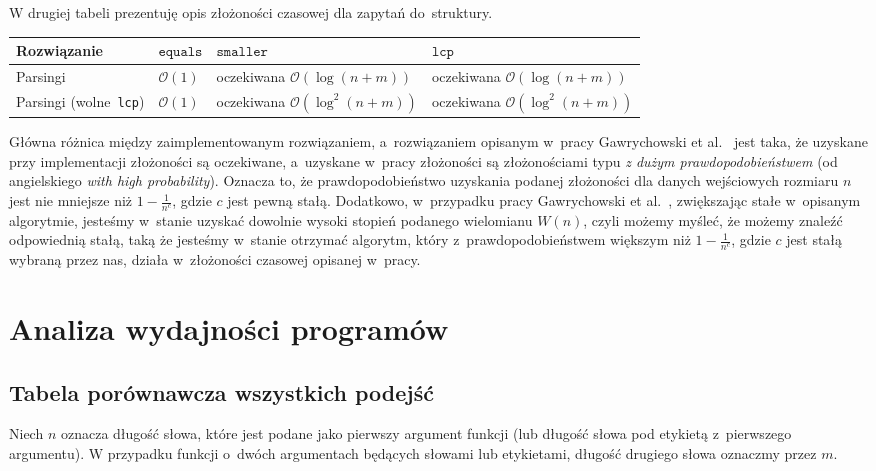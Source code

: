 \documentclass[declaration,shortabstract]{iithesis}
\theoremstyle{definition} \newtheorem{definition}{Definicja}[chapter]
\theoremstyle{plain} \newtheorem{remark}[definition]{Obserwacja}
\theoremstyle{plain} \newtheorem{theorem}[definition]{Twierdzenie}
\theoremstyle{plain} \newtheorem{example}{Przykład}[definition]
\theoremstyle{plain} \newtheorem{lemma}[definition]{Lemat}
\begin{document}
W drugiej tabeli prezentuję opis złożoności czasowej dla zapytań do~struktury.

\begin{center}
    \begin{tabular}{ | m{3cm} | >{\centering\arraybackslash}m{3cm} | >{\centering\arraybackslash}m{3cm} | >{\centering\arraybackslash}m{3cm} | }
        \hline 
        Rozwiązanie & $\texttt{equals}$ & $\texttt{smaller}$ & $\texttt{lcp}$ \\
        \hline
        Parsingi & $\mathcal{O}(1)$ & oczekiwana $\mathcal{O}(\log(n + m))$ & oczekiwana $\mathcal{O}(\log(n + m))$ \\
        \hline
        Parsingi (wolne~\texttt{lcp}) & $\mathcal{O}(1)$ & oczekiwana $\mathcal{O}(\log^2(n + m))$ & oczekiwana $\mathcal{O}(\log^2(n + m))$ \\
        \hline
    \end{tabular}
\end{center}

Główna różnica między zaimplementowanym rozwiązaniem, a~rozwiązaniem opisanym w~pracy Gawrychowski et al.~\cite{gawrychowski} jest taka, że uzyskane przy implementacji złożoności są oczekiwane, a~uzyskane w~pracy złożoności są złożonościami typu \textit{z dużym prawdopodobieństwem} (od angielskiego \textit{with high probability}). Oznacza to, że prawdopodobieństwo uzyskania podanej złożoności dla danych wejściowych rozmiaru $n$ jest nie mniejsze niż $1 - \frac{1}{n^c}$, gdzie $c$ jest pewną stałą. Dodatkowo, w~przypadku pracy Gawrychowski et al.~\cite{gawrychowski}, zwiększając stałe w~opisanym algorytmie, jesteśmy w~stanie uzyskać dowolnie wysoki stopień podanego wielomianu $W(n)$, czyli możemy myśleć, że możemy znaleźć odpowiednią stałą, taką że jesteśmy w~stanie otrzymać algorytm, który z~prawdopodobieństwem większym niż $1 - \frac{1}{n^c}$, gdzie $c$ jest stałą wybraną przez nas, działa w~złożoności czasowej opisanej w~pracy.

\chapter{Analiza wydajności programów}

\section{Tabela porównawcza wszystkich podejść}

Niech $n$ oznacza długość słowa, które jest podane jako pierwszy argument funkcji (lub długość słowa pod etykietą z~pierwszego argumentu). W przypadku funkcji o~dwóch argumentach będących słowami lub etykietami, długość drugiego słowa oznaczmy przez $m$.
\end{document}
